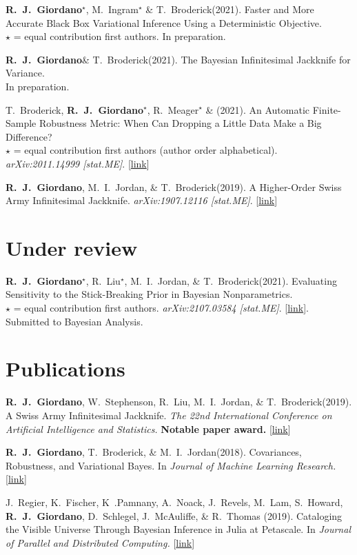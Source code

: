 \documentclass[margin,line]{res}
\newcommand{\me}{\textbf{R.~J.~Giordano}\xspace}
\newcommand{\mestar}{\textbf{R.~J.~Giordano}$^{\star}$\xspace}
\newcommand{\tamara}{T.~Broderick\xspace}
\newcommand{\mike}{M.~I.~Jordan\xspace}
\newcommand{\runjing}{R.~Liu\xspace}
\newcommand{\paperref}[1]{[\href{#1}{link}]}
\newcommand{\paperref}[1]{}
\begin{document}
\begin{resume}
\mestar, M.~Ingram$^\star$ \& \tamara  (2021).
Faster and More Accurate Black Box Variational Inference Using a Deterministic Objective.\\
$\star$ = equal contribution first authors.
In preparation.

\me \& \tamara  (2021).
The Bayesian Infinitesimal Jackknife for Variance.\\
In preparation.

\tamara, \mestar, R.~Meager$^\star$ \&  (2021).
An Automatic Finite-Sample Robustness Metric: When Can Dropping a Little Data
Make a Big Difference?\\
$\star$ = equal contribution first authors (author order alphabetical).
\emph{arXiv:2011.14999 [stat.ME]}.
\paperref{https://arxiv.org/abs/2011.14999}

\me, \mike, \& \tamara (2019).
A Higher-Order Swiss Army Infinitesimal Jackknife.
\emph{arXiv:1907.12116 [stat.ME]}.
\paperref{https://arxiv.org/abs/1907.12116}

\section{\sc Under review}

\mestar, \runjing{}$^\star$, \mike, \& \tamara (2021).
Evaluating Sensitivity to the Stick-Breaking Prior in Bayesian Nonparametrics.\\
$\star$ = equal contribution first authors.
\emph{arXiv:2107.03584 [stat.ME]}.
\paperref{https://arxiv.org/abs/2107.03584}.\\
Submitted to Bayesian Analysis.


\section{\sc Publications}

\me, W.~Stephenson, \runjing, \mike, \& \tamara (2019).  A Swiss Army Infinitesimal
Jackknife.  \emph{The 22nd International Conference on Artificial Intelligence
and Statistics.}
\textbf{Notable paper award.}
\paperref{https://arxiv.org/abs/1806.00550}

\me, \tamara, \& \mike (2018).  Covariances, Robustness, and Variational Bayes.
In \emph{Journal of Machine Learning Research.}
\paperref{https://arxiv.org/abs/1709.02536}

J.~Regier, K.~Fischer, K~.Pamnany, A.~Noack, J.~Revels, M.~Lam, S.~Howard,
\me, D.~Schlegel, J.~McAuliffe, \& R.~Thomas (2019). Cataloging the Visible
Universe Through Bayesian Inference in Julia at Petascale. In \emph{Journal of
Parallel and Distributed Computing.}
\paperref{https://doi.org/10.1016/j.jpdc.2018.12.008}


\end{resume}
\end{document}
